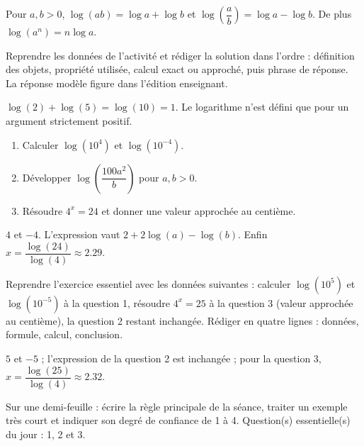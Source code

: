 \begin{summary}Pour $a,b>0$, $\log(ab)=\log a+\log b$ et $\log\!\left(\dfrac ab\right)=\log a-\log b$. De plus $\log(a^n)=n\log a$.\end{summary}

\begin{example}
Reprendre les données de l'activité et rédiger la solution dans l'ordre : définition des objets, propriété utilisée, calcul exact ou approché, puis phrase de réponse. La réponse modèle figure dans l'édition enseignant.
\end{example}
\begin{solution}$\log(2)+\log(5)=\log(10)=1$. Le logarithme n'est défini que pour un argument strictement positif.\end{solution}

\begin{exercise}[essentiel]
\begin{enumerate}\item Calculer $\log(10^4)$ et $\log(10^{-4})$.\item Développer $\log\!\left(\dfrac{100a^2}{b}\right)$ pour $a,b>0$.\item Résoudre $4^x=24$ et donner une valeur approchée au centième.\end{enumerate}
\end{exercise}
\begin{solution}$4$ et $-4$. L'expression vaut $2+2\log(a)-\log(b)$. Enfin $x=\dfrac{\log(24)}{\log(4)}\approx\num{2,29}$.\end{solution}


\begin{homework}Reprendre l'exercice essentiel avec les données suivantes : calculer $\log(10^{5})$ et $\log(10^{-5})$ à la question 1, résoudre $4^x=25$ à la question 3 (valeur approchée au centième), la question 2 restant inchangée. Rédiger en quatre lignes : données, formule, calcul, conclusion.\end{homework}
\begin{solution}$5$ et $-5$ ; l'expression de la question 2 est inchangée ; pour la question 3, $x=\dfrac{\log(25)}{\log(4)}\approx\num{2,32}$.\end{solution}

\begin{exitticket}[3 minutes]Sur une demi-feuille : écrire la règle principale de la séance, traiter un exemple très court et indiquer son degré de confiance de 1 à 4. Question(s) essentielle(s) du jour : 1, 2 et 3.\end{exitticket}

